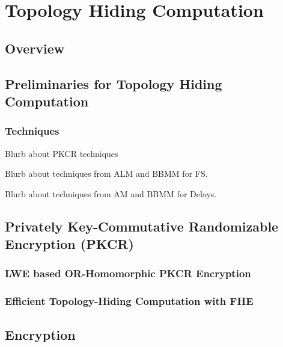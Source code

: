 \chapter{Topology Hiding Computation}

\section{Overview}


\section{Preliminaries for Topology Hiding Computation}\label{sec:prelim}



\subsection{Techniques}
Blurb about PKCR techniques

Blurb about techniques from ALM and BBMM for FS.

Blurb about techniques from AM and BBMM for Delays.

\section{Privately Key-Commutative Randomizable Encryption (PKCR)}

\subsection{LWE based OR-Homomorphic PKCR Encryption}\label{sec:lwe-pkcr}


\subsection{Efficient Topology-Hiding Computation with FHE}\label{sec:fhe-dopke}


\section{\schScheme Encryption}\label{app-05-pkcr-ext}



